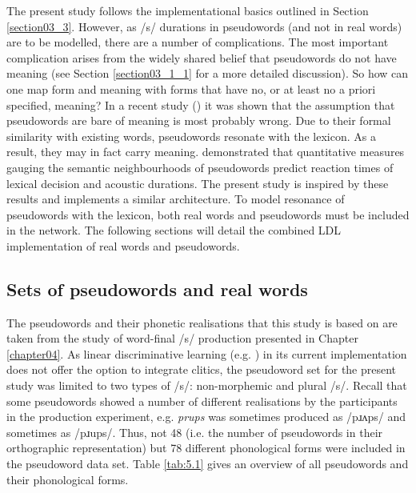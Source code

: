 The present study follows the implementational basics outlined in Section \ref{section03_3}. However, as /s/ durations in pseudowords (and not in real words) are to be modelled, there are a number of complications. The most important complication arises from the widely shared belief that pseudowords do not have meaning (see Section \ref{section03_1_1} for a more detailed discussion). So how can one map form and meaning with forms that have no, or at least no a priori specified, meaning? In a recent study (\cite{Chuang2021}) it was shown that the assumption that pseudowords are bare of meaning is most probably wrong. Due to their formal similarity with existing words, pseudowords resonate with the lexicon. As a result, they may in fact carry meaning. \citet{Chuang2021} demonstrated that quantitative measures gauging the semantic neighbourhoods of pseudowords predict reaction times of lexical decision and acoustic durations. The present study is inspired by these results and implements a similar architecture. To model resonance of pseudowords with the lexicon, both real words and pseudowords must be included in the network. The following sections will detail the combined LDL implementation of real words and pseudowords.

\subsection{Sets of pseudowords and real words}\label{section05_1_2}

The pseudowords and their phonetic realisations that this study is based on are taken from the study of word-final /s/ production presented in Chapter \ref{chapter04}. As linear discriminative learning (e.g. \cite{Baayen2019}) in its current implementation does not offer the option to integrate clitics, the pseudoword set for the present study was limited to two types of /s/: non-morphemic and plural /s/. Recall that some pseudowords showed a number of different realisations by the participants in the production experiment, e.g. \textit{prups} was sometimes produced as /pɹʌps/ and sometimes as /pɹups/. Thus, not 48 (i.e. the number of pseudowords in their orthographic representation) but 78 different phonological forms were included in the pseudoword data set. Table \ref{tab:5.1} gives an overview of all pseudowords and their phonological forms.

